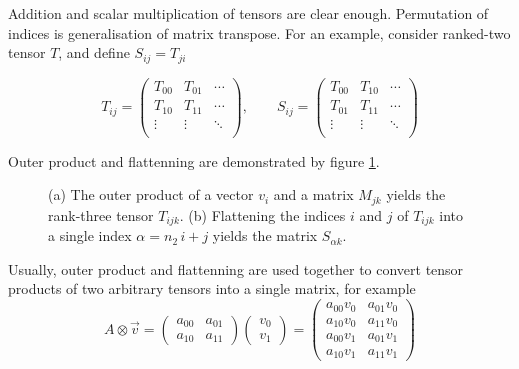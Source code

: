 Addition and scalar multiplication of tensors are clear enough. 
Permutation of indices is generalisation of matrix transpose. 
For an example, consider ranked-two tensor $T$, and define $S_{ij} = T_{ji}$

\begin{equation*}
	T_{ij} =
	\begin{pmatrix}
		T_{00} & T_{01} & \cdots  \\
		T_{10} & T_{11} & \cdots \\ 
		\vdots & \vdots & \ddots \\
	\end{pmatrix}, \qquad
	S_{ij} =
	\begin{pmatrix}
		T_{00} & T_{10} & \cdots  \\
		T_{01} & T_{11} & \cdots \\ 
		\vdots & \vdots & \ddots \\
	\end{pmatrix}
\end{equation*}

Outer product and flattenning are demonstrated by figure \ref{fig:outer-flatten}.

\begin{figure}[ht]
\centering

\caption{(a) The outer product of a vector $v_i$ and a matrix $M_{jk}$ yields the rank-three tensor $T_{ijk}$. (b) Flattening the indices $i$ and $j$ of $T_{ijk}$ into a single index $\alpha = n_2\, i + j$ yields the matrix $S_{\alpha k}$.}
\label{fig:outer-flatten}
\end{figure}

Usually, outer product and flattenning are used together to convert tensor products of two arbitrary tensors into a single matrix, for example
\begin{equation}
	A \otimes \vec{v} = 
	\begin{pmatrix}
		a_{00} & a_{01}\\
		a_{10} & a_{11}
	\end{pmatrix}
	\begin{pmatrix}
		v_0 \\ v_1	
	\end{pmatrix}
	= 
	\begin{pmatrix}
		a_{00} v_0 & a_{01} v_0 \\
		a_{10} v_0 & a_{11} v_0 \\
		a_{00} v_1 & a_{01} v_1 \\
		a_{10} v_1 & a_{11} v_1
	\end{pmatrix}
\end{equation}

